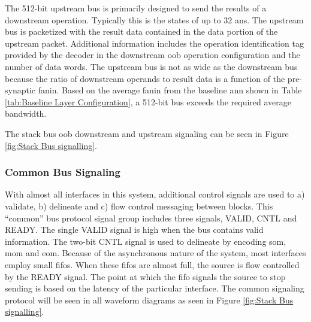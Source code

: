 The 512-bit upstream bus is primarily designed to send the results of a downstream operation. Typically this is the states of up to 32 \acp{an}.
The upstream bus is packetized with the result data contained in the data portion of the upstream packet.
Additional information includes the operation identification tag provided by the decoder in the downstream \ac{oob} operation configuration and the number of data words.
The upstream bus is not as wide as the downstream bus because the ratio of downstream operands to result data is a function of the pre-synaptic fanin.
Based on the average fanin from the baseline \ac{ann} shown in Table \ref{tab:Baseline Layer Configuration}, a 512-bit bus exceeds the required average bandwidth.

The stack bus \ac{oob} downstream and upstream signaling can be seen in Figure \ref{fig:Stack Bus signalling}.

\subsubsection{Common Bus Signaling}
\label{sec:Common Bus Signalling}

With almost all interfaces in this system, additional control signals are used to a) validate, b) delineate and c) flow control messaging between blocks.
This ``common'' bus protocol signal group includes three signals, VALID, CNTL and READY. 
The single VALID signal is high when the bus contains valid information. The two-bit CNTL signal is used to delineate by encoding \ac{som}, \ac{mom} and \ac{eom}.
Because of the asynchronous nature of the system, most interfaces employ small \acp{fifo}. When these \acp{fifo} are almost full, the source is flow controlled by the READY signal. 
The point at which the \ac{fifo} signals the source to stop sending is based on the latency of the particular interface. 
The common signaling protocol will be seen in all waveform diagrams as seen in Figure \ref{fig:Stack Bus signalling}.


